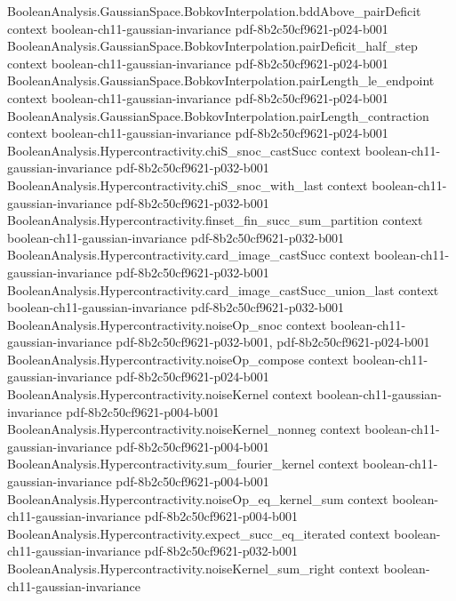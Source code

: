 \begin{theorem}
\proofstep
  {BooleanAnalysis.GaussianSpace.BobkovInterpolation.bddAbove_pairDeficit}
  {context}
  {boolean-ch11-gaussian-invariance}
  {pdf-8b2c50cf9621-p024-b001}
\proofstep
  {BooleanAnalysis.GaussianSpace.BobkovInterpolation.pairDeficit_half_step}
  {context}
  {boolean-ch11-gaussian-invariance}
  {pdf-8b2c50cf9621-p024-b001}
\proofstep
  {BooleanAnalysis.GaussianSpace.BobkovInterpolation.pairLength_le_endpoint}
  {context}
  {boolean-ch11-gaussian-invariance}
  {pdf-8b2c50cf9621-p024-b001}
\proofstep
  {BooleanAnalysis.GaussianSpace.BobkovInterpolation.pairLength_contraction}
  {context}
  {boolean-ch11-gaussian-invariance}
  {pdf-8b2c50cf9621-p024-b001}
\proofstep
  {BooleanAnalysis.Hypercontractivity.chiS_snoc_castSucc}
  {context}
  {boolean-ch11-gaussian-invariance}
  {pdf-8b2c50cf9621-p032-b001}
\proofstep
  {BooleanAnalysis.Hypercontractivity.chiS_snoc_with_last}
  {context}
  {boolean-ch11-gaussian-invariance}
  {pdf-8b2c50cf9621-p032-b001}
\proofstep
  {BooleanAnalysis.Hypercontractivity.finset_fin_succ_sum_partition}
  {context}
  {boolean-ch11-gaussian-invariance}
  {pdf-8b2c50cf9621-p032-b001}
\proofstep
  {BooleanAnalysis.Hypercontractivity.card_image_castSucc}
  {context}
  {boolean-ch11-gaussian-invariance}
  {pdf-8b2c50cf9621-p032-b001}
\proofstep
  {BooleanAnalysis.Hypercontractivity.card_image_castSucc_union_last}
  {context}
  {boolean-ch11-gaussian-invariance}
  {pdf-8b2c50cf9621-p032-b001}
\proofstep
  {BooleanAnalysis.Hypercontractivity.noiseOp_snoc}
  {context}
  {boolean-ch11-gaussian-invariance}
  {pdf-8b2c50cf9621-p032-b001,
    pdf-8b2c50cf9621-p024-b001}
\proofstep
  {BooleanAnalysis.Hypercontractivity.noiseOp_compose}
  {context}
  {boolean-ch11-gaussian-invariance}
  {pdf-8b2c50cf9621-p024-b001}
\proofstep
  {BooleanAnalysis.Hypercontractivity.noiseKernel}
  {context}
  {boolean-ch11-gaussian-invariance}
  {pdf-8b2c50cf9621-p004-b001}
\proofstep
  {BooleanAnalysis.Hypercontractivity.noiseKernel_nonneg}
  {context}
  {boolean-ch11-gaussian-invariance}
  {pdf-8b2c50cf9621-p004-b001}
\proofstep
  {BooleanAnalysis.Hypercontractivity.sum_fourier_kernel}
  {context}
  {boolean-ch11-gaussian-invariance}
  {pdf-8b2c50cf9621-p004-b001}
\proofstep
  {BooleanAnalysis.Hypercontractivity.noiseOp_eq_kernel_sum}
  {context}
  {boolean-ch11-gaussian-invariance}
  {pdf-8b2c50cf9621-p004-b001}
\proofstep
  {BooleanAnalysis.Hypercontractivity.expect_succ_eq_iterated}
  {context}
  {boolean-ch11-gaussian-invariance}
  {pdf-8b2c50cf9621-p032-b001}
\proofstep
  {BooleanAnalysis.Hypercontractivity.noiseKernel_sum_right}
  {context}
  {boolean-ch11-gaussian-invariance}

\end{theorem}
